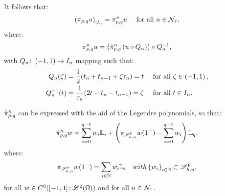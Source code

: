 It follows that:
\begin{gather}
    \left( \pi_{p, q} u \right)_{\mid I_n} = \pi_{p, q}^n u \quad \text{ for all } n \in \mathcal{N}_{\tau},
\end{gather}
where:
\begin{gather}
    \pi_{p, q}^n u = \left( \hat{\pi}_{p, q}^n \left( u \circ Q_n \right) \right) \circ Q_n^{-1},
\end{gather}
with $Q_n \colon \left( -1, 1 \right) \rightarrow I_n$ mapping such that:
\begin{align}
    Q_n(\zeta) &= \frac{1}{2}(t_n + t_{n - 1} + \zeta \tau_n) = t \quad \text{ for all } \zeta \in \left( -1, 1 \right), \\
    Q_n^{-1}(t) &= \frac{1}{\tau_n}(2t - t_n - t_{n - 1}) = \zeta \quad \text{ for all } t \in I_n.
\end{align}

\begin{lemma} \label{lemma:legendre_interpolant}
    $\hat{\pi}_{p, q}^n$ can be expressed with the aid of the Legendre polynomials, so that:
    \begin{gather}
        \hat{\pi}_{p, q}^n w = \sum_{i = 0}^{q - 1} w_i \mathbb{L}_i + \left( \pi_{\mathscr{S}^p_{h, n}} w(1^-) - \sum_{i = 0}^{q - 1} w_i \right) \mathbb{L}_q,
    \end{gather}
    where:
    \begin{gather}
        \pi_{\mathscr{S}^p_{h, n}} w(1^-) = \sum_{i \in \mathbb{N}} w_i \mathbb{L}_i \quad{ with } \left\{ w_i \right\}_{i \in \mathbb{N}} \subset \mathscr{S}^p_{h, n},
    \end{gather}
    for all $w \in C^0(\left[ -1, 1 \right]; \mathscr{L}^{2}(\Omega))$ and for all $n \in \mathcal{N}_{\tau}$. 
\end{lemma}

